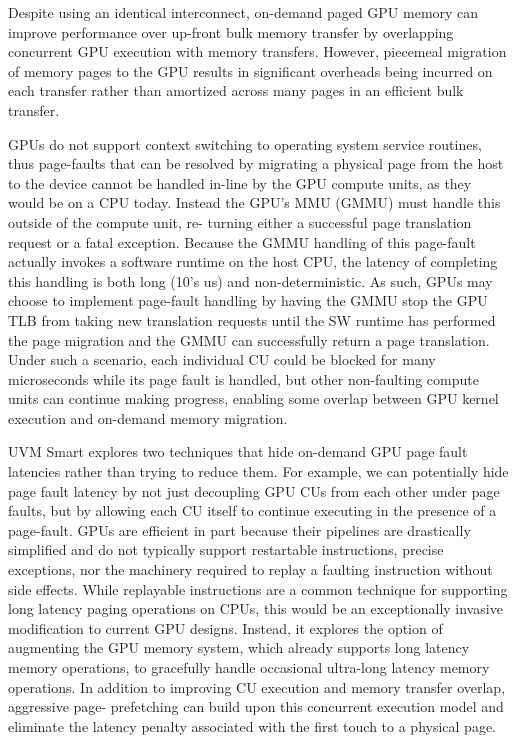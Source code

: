 Despite using an identical interconnect, on-demand paged GPU memory can improve performance over up-front bulk memory transfer by overlapping concurrent GPU execution with memory transfers. However, piecemeal migration of memory pages to the GPU results in significant overheads being incurred on each transfer rather than amortized across many pages in an efficient bulk transfer. 

GPUs do not support context switching to operating system service routines, thus page-faults that can be resolved by migrating a physical page from the host to the device cannot be handled in-line by the GPU compute units, as they would be on a CPU today. Instead the GPU’s MMU (GMMU) must handle this outside of the compute unit, re- turning either a successful page translation request or a fatal exception. Because the GMMU handling of this page-fault actually invokes a software runtime on the host CPU, the latency of completing this handling is both long (10’s us) and non-deterministic. As such, GPUs may choose to implement page-fault handling by having the GMMU stop the GPU TLB from taking new translation requests until the SW runtime has performed the page migration and the GMMU can successfully return a page translation. Under such a scenario, each individual CU could be blocked for many microseconds while its page fault is handled, but other non-faulting compute units can continue making progress, enabling some overlap between GPU kernel execution and on-demand memory migration.

UVM Smart explores two techniques that hide on-demand GPU page fault latencies rather than trying to reduce them. For example, we can potentially hide page fault latency by not just decoupling GPU CUs from each other under page faults, but by allowing each CU itself to continue executing in the presence of a page-fault. GPUs are efficient in part because their pipelines are drastically simplified and do not typically support restartable instructions, precise exceptions, nor the machinery required to replay a faulting instruction without side effects. While replayable instructions are a common technique for supporting long latency paging operations on CPUs, this would be an exceptionally invasive modification to current GPU designs. Instead, it explores the option of augmenting the GPU memory system, which already supports long latency memory operations, to gracefully handle occasional ultra-long latency memory operations. In addition to improving CU execution and memory transfer overlap, aggressive page- prefetching can build upon this concurrent execution model and eliminate the latency penalty associated with the first touch to a physical page.